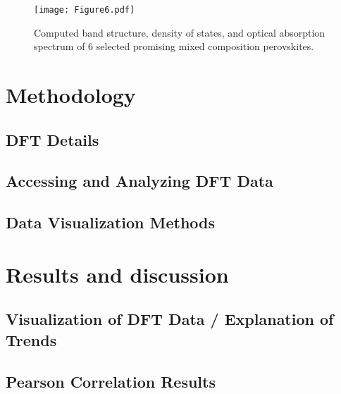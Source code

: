 \documentclass[twoside,twocolumn,9pt]{article}
\begin{document}
\begin{figure}[h]
\centering
\texttt{[image: Figure6.pdf]}
\caption{\label{Fig:outline} 
Computed band structure, density of states, and optical absorption spectrum of 6 selected promising mixed composition perovskites.}
\end{figure}


\newpage



\section*{Methodology}

\subsection*{DFT Details}


\subsection*{Accessing and Analyzing DFT Data}

\subsection*{Data Visualization Methods}

\newpage




\section*{Results and discussion}

\subsection*{Visualization of DFT Data / Explanation of Trends}

\subsection*{Pearson Correlation Results}
\end{document}
